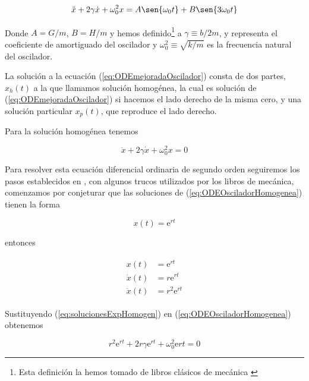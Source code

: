 \documentclass[a4paper,10pt]{article}
\numberwithin{equation}{section}
\newcommand{\euler}{\mathrm{e}}
\begin{document}
\begin{equation}
 \ddot{x} + 2\gamma \dot{x} + \omega_0^2 x = A \sen{\omega_0 t} + B \sen{3\omega_0 t}
 \label{eq:ODEmejoradaOscilador}
\end{equation}

Donde $A = G/m$, $B = H/m$ y hemos definido\footnote{Esta definición la hemos tomado de libros clásicos de mecánica \cite{marion,taylor}} 
a  $\gamma \equiv b/2m$, y representa el coeficiente de amortiguado del oscilador 
y $\omega_0^2 \equiv \sqrt{k/m}$ es la frecuencia natural del oscilador. 

\vspace{.3cm}

La solución a la ecuación (\ref{eq:ODEmejoradaOscilador}) consta de dos partes,
$x_h(t)$ a la que llamamos solución homogénea, la cual es solución de (\ref{eq:ODEmejoradaOscilador})
si hacemos el lado derecho de la misma cero, y una solución particular $x_p(t)$, que 
reproduce el lado derecho. 

\vspace{.3cm}

Para la solución homogénea tenemos 

\begin{equation}
 \ddot{x} + 2 \gamma \dot{x} + \omega_0^2 x = 0 
 \label{eq:ODEOsciladorHomogenea}
\end{equation}

Para resolver esta ecuación diferencial ordinaria de segundo orden seguiremos los pasos
establecidos en \cite{zill}, con algunos trucos utilizados por los libros de mecánica,
comenzamos por conjeturar que las soluciones de (\ref{eq:ODEOsciladorHomogenea}) tienen 
la forma 

$$
x(t) = \euler^{rt}
$$

entonces

\begin{align}
 \begin{split}
  x(t) &= \euler^{rt} \\
  \dot{x}(t) &= r\euler^{rt} \\
  \ddot{x}(t) &= r^2\euler^{rt} 
  \label{eq:solucionesExpHomogen}
 \end{split}
\end{align}

Sustituyendo (\ref{eq:solucionesExpHomogen}) en (\ref{eq:ODEOsciladorHomogenea}) obtenemos

\begin{equation}
 r^2 \euler^{rt} + 2r\gamma \euler^{rt} + \omega_0^2 \euler{rt} = 0
 \label{eq:CasiCaracteristica}
\end{equation}
\end{document}
